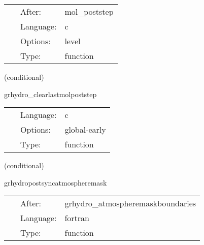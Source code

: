 \documentclass{article}
\begin{document}
\hspace{5mm}{\it reset inlastmolpoststep to zero } 


\hspace{5mm}

 \begin{tabular*}{160mm}{cll} 
~ & After:  & mol\_poststep \\ 
~ & Language:  & c \\ 
~ & Options:  & level \\ 
~ & Type:  & function \\ 
\end{tabular*} 


\vspace{5mm}

   (conditional) 

\hspace{5mm} grhydro\_clearlastmolpoststep 

\hspace{5mm}{\it initialize inlastmolpoststep to zero } 


\hspace{5mm}

 \begin{tabular*}{160mm}{cll} 
~ & Language:  & c \\ 
~ & Options:  & global-early \\ 
~ & Type:  & function \\ 
\end{tabular*} 


\vspace{5mm}

   (conditional) 

\hspace{5mm} grhydropostsyncatmospheremask 

\hspace{5mm}{\it set integer atmosphere mask from synchronized real atmosphere mask } 


\hspace{5mm}

 \begin{tabular*}{160mm}{cll} 
~ & After:  & grhydro\_atmospheremaskboundaries \\ 
~ & Language:  & fortran \\ 
~ & Type:  & function \\ 
\end{tabular*} 


\vspace{5mm}
\end{document}
